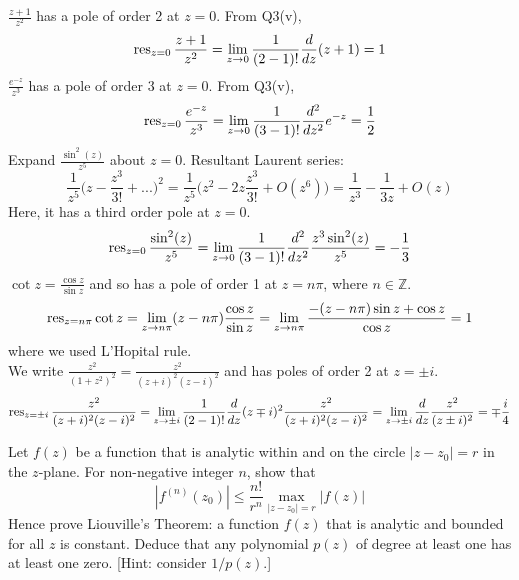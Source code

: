 \documentclass[a4paper]{article}
\begin{document}
\begin{ans}
$\frac{z+1}{z^2}$ has a pole of order 2 at $z=0$. From Q3(v),
$$\operatorname{res}_{z=0}\frac{z+1}{z^2}=\lim_{z\rightarrow0}\frac{1}{(2-1)!}\frac{d}{dz}(z+1)=1$$
$\frac{e^{-z}}{z^3}$ has a pole of order 3 at $z=0$. From Q3(v),
$$\operatorname{res}_{z=0}\frac{e^{-z}}{z^3}=\lim_{z\rightarrow0}\frac{1}{(3-1)!}\frac{d^2}{dz^2}e^{-z}=\frac{1}{2}$$
Expand $\frac{\sin^2(z)}{z^5}$ about $z=0$. Resultant Laurent series:
$$\frac{1}{z^5}\bigg(z-\frac{z^3}{3!}+...\bigg)^2=\frac{1}{z^5}\bigg(z^2-2z\frac{z^3}{3!}+O(z^6)\bigg)=\frac{1}{z^3}-\frac{1}{3z}+O(z)$$
Here, it has a third order pole at $z=0$.
$$\operatorname{res}_{z=0}\frac{\sin^2(z)}{z^5}=\lim_{z\rightarrow0}\frac{1}{(3-1)!}\frac{d^2}{dz^2}\frac{z^3\sin^2(z)}{z^5}=-\frac{1}{3}$$
$\cot z=\frac{\cos z}{\sin z}$ and so has a pole of order 1 at $z=n\pi$, where $n\in\mathbb{Z}$.
$$\operatorname{res}_{z=n\pi}\cot z=\lim_{z\rightarrow n\pi}(z-n\pi)\frac{\cos z}{\sin z}=\lim_{z\rightarrow n\pi}\frac{-(z-n\pi)\sin z+\cos z}{\cos z}=1$$
where we used L'Hopital rule.\\[5pt]
We write $\frac{z^2}{(1+z^2)^2}=\frac{z^2}{(z+i)^2(z-i)^2}$ and has poles of order 2 at $z=\pm i$.
$$\operatorname{res}_{z=\pm i}\frac{z^2}{(z+i)^2(z-i)^2}=\lim_{z\rightarrow\pm i}\frac{1}{(2-1)!}\frac{d}{dz}(z\mp i)^2\frac{z^2}{(z+i)^2(z-i)^2}=\lim_{z\rightarrow\pm i}\frac{d}{dz}\frac{z^2}{(z\pm i)^2}=\mp\frac{i}{4}$$
\end{ans}
\begin{qns}
Let $f(z)$ be a function that is analytic within and on the circle $|z-z_0|=r$ in the $z$-plane. For non-negative integer $n$, show that
$$|f^{(n)}(z_0)|\leq\frac{n!}{r^n}\max_{|z-z_0|=r}|f(z)|$$
Hence prove Liouville's Theorem: a function $f(z)$ that is analytic and bounded for all $z$ is constant. Deduce that any polynomial $p(z)$ of degree at least one has at least one zero. [Hint: consider $1/p(z)$.]
\end{qns}
\end{document}
